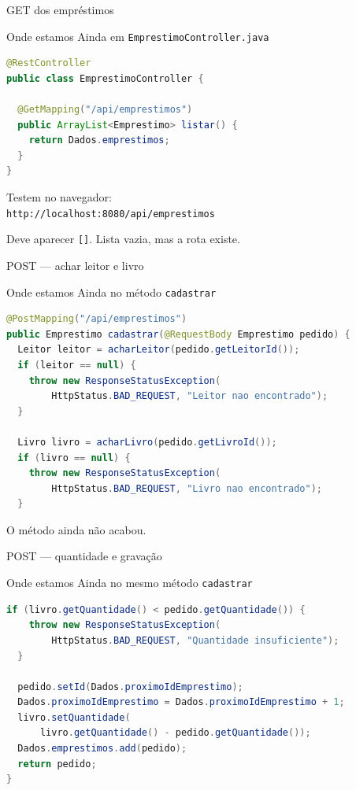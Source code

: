 \documentclass[aspectratio=169,11pt]{beamer}
\newcommand{\onde}[1]{%
  \begin{block}{Onde estamos}
    #1
  \end{block}
}
\begin{document}
\begin{frame}[fragile]{GET dos empréstimos}
  \onde{Ainda em \texttt{EmprestimoController.java}}

\begin{lstlisting}[language=Java,basicstyle=\ttfamily\footnotesize]
@RestController
public class EmprestimoController {

  @GetMapping("/api/emprestimos")
  public ArrayList<Emprestimo> listar() {
    return Dados.emprestimos;
  }
}
\end{lstlisting}

  \vspace{0.4em}
  Testem no navegador:\\
  \texttt{http://localhost:8080/api/emprestimos}

  \vspace{0.3em}
  Deve aparecer \texttt{[]}. Lista vazia, mas a rota existe.
\end{frame}

\begin{frame}[fragile]{POST --- achar leitor e livro}
  \onde{Ainda no método \texttt{cadastrar}}

\begin{lstlisting}[language=Java,basicstyle=\ttfamily\scriptsize]
@PostMapping("/api/emprestimos")
public Emprestimo cadastrar(@RequestBody Emprestimo pedido) {
  Leitor leitor = acharLeitor(pedido.getLeitorId());
  if (leitor == null) {
    throw new ResponseStatusException(
        HttpStatus.BAD_REQUEST, "Leitor nao encontrado");
  }

  Livro livro = acharLivro(pedido.getLivroId());
  if (livro == null) {
    throw new ResponseStatusException(
        HttpStatus.BAD_REQUEST, "Livro nao encontrado");
  }
\end{lstlisting}

  O método ainda não acabou.
\end{frame}

\begin{frame}[fragile]{POST --- quantidade e gravação}
  \onde{Ainda no mesmo método \texttt{cadastrar}}

\begin{lstlisting}[language=Java,basicstyle=\ttfamily\scriptsize]
  if (livro.getQuantidade() < pedido.getQuantidade()) {
    throw new ResponseStatusException(
        HttpStatus.BAD_REQUEST, "Quantidade insuficiente");
  }

  pedido.setId(Dados.proximoIdEmprestimo);
  Dados.proximoIdEmprestimo = Dados.proximoIdEmprestimo + 1;
  livro.setQuantidade(
      livro.getQuantidade() - pedido.getQuantidade());
  Dados.emprestimos.add(pedido);
  return pedido;
}
\end{lstlisting}
\end{frame}
\end{document}
